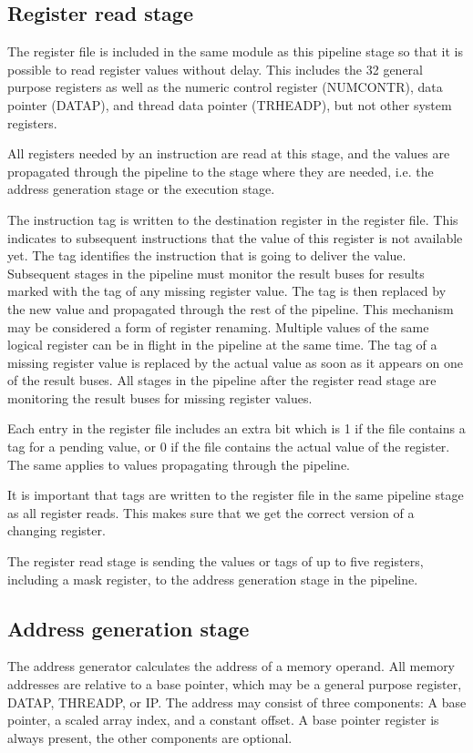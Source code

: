 \documentclass[11pt,a4paper,oneside,openright]{report}
\newcommand{\vv}{ \vspace{2mm} }   %
\begin{document}
\subsection{Register read stage}
The register file is included in the same module as this pipeline stage so that it is possible to read register values without delay. This includes the 32 general purpose registers as well as the numeric control register (NUMCONTR), data pointer (DATAP), and thread data pointer (TRHEADP), but not other system registers.
\vv

All registers needed by an instruction are read at this stage, and the values are propagated through the pipeline to the stage where they are needed, i.e. the address generation stage or the execution stage.
\vv

The instruction tag is written to the destination register in the register file. This indicates to subsequent instructions that the value of this register is not available yet. The tag identifies the instruction that is going to deliver the value. Subsequent stages in the pipeline must monitor the result buses for results marked with the tag of any missing register value. The tag is then replaced by the new value and propagated through the rest of the pipeline. 
This mechanism may be considered a form of register renaming. Multiple values of the same logical register can be in flight in the pipeline at the same time. The tag of a missing register value is replaced by the actual value as soon as it appears on one of the result buses. All stages in the pipeline after the register read stage are monitoring the result buses for missing register values.
\vv

Each entry in the register file includes an extra bit which is 1 if the file contains a tag for a pending value, or 0 if the file contains the actual value of the register. The same applies to values propagating through the pipeline.
\vv

It is important that tags are written to the register file in the same pipeline stage as all register reads. This makes sure that we get the correct version of a changing register.
\vv

The register read stage is sending the values or tags of up to five registers, including a mask register, to the address generation stage in the pipeline.
\vv


\subsection{Address generation stage}
The address generator calculates the address of a memory operand. 
All memory addresses are relative to a base pointer, which may be a general purpose register, DATAP, THREADP, or IP. 
The address may consist of three components: A base pointer, a scaled array index, and a constant offset. A base pointer register is always present, the other components are optional.
\vv
\end{document}
